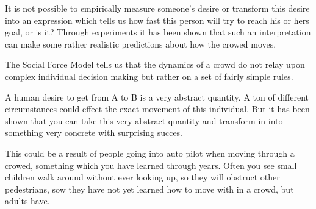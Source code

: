 It is not 
possible to empirically measure someone's desire or transform this desire 
into an expression which tells us how fast this person will try to reach his 
or hers goal, or is it?
Through experiments it has been shown that such an interpretation can make 
some rather realistic predictions about how the crowed moves.

The Social Force Model tells us that the dynamics of a crowd do not
relay upon complex individual decision making but rather on a set of
fairly simple rules.

A human desire to get from A to B is a very abstract quantity. A ton of
different circumstances could effect the exact movement of this
individual. But it has been shown that you can take this very abstract
quantity and transform in into something very concrete with surprising
succes.

This could be a result of people going into auto pilot when moving
through a crowed, something which you have learned through years. Often you
see small children walk around without ever looking up, so they will
obstruct other pedestrians, sow they have not yet learned how to move
with in a crowd, but adults have.

